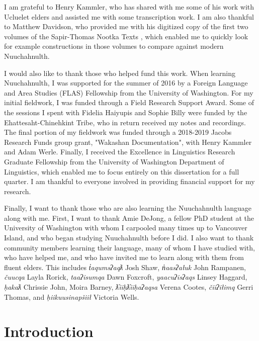 {{    I am grateful to Henry Kammler, who has shared with me some of his work with Ucluelet elders and assisted me with some transcription work. I am also thankful to Matthew Davidson, who provided me with his digitized copy of the first two volumes of the Sapir-Thomas Nootka Texts \citep{sapir1939, sapir1955}, which enabled me to quickly look for example constructions in those volumes to compare against modern Nuuchahnulth.
    
    I would also like to thank those who helped fund this work. When learning Nuuchahnulth, I was supported for the summer of 2016 by a Foreign Language and Area Studies (FLAS) Fellowship from the University of Washington. For my initial fieldwork, I was funded through a Field Research Support Award. Some of the sessions I spent with Fidelia Haiyupis and Sophie Billy were funded by the Ehattesaht-Chinehkint Tribe, who in return received my notes and recordings. The final portion of my fieldwork was funded through a 2018-2019 Jacobs Research Funds group grant, "Wakashan Documentation", with Henry Kammler and Adam Werle. Finally, I received the Excellence in Linguistics Research Graduate Fellowship from the University of Washington Department of Linguistics, which enabled me to focus entirely on this dissertation for a full quarter. I am thankful to everyone involved in providing financial support for my research.
    
    Finally, I want to thank those who are also learning the Nuuchahnulth language along with me. First, I want to thank Amie DeJong, a fellow PhD student at the University of Washington with whom I carpooled many times up to Vancouver Island, and who began studying Nuuchahnulth before I did. I also want to thank community members learning their language, many of whom I have studied with, who have helped me, and who have invited me to learn along with them from fluent elders. This includes \textit{t̓aqumsʔaqƛ} Josh Shaw, \textit{n̓aasʔałuk} John Rampanen, \textit{čuucqa} Layla Rorick, \textit{taaʔisumqa} Dawn Foxcroft, \textit{yaacuʔisʔaqs} Linsey Haggard, \textit{ḥakaƛ} Chrissie John, Moira Barney, \textit{ƛ̓iiḥƛ̓iiḥaʔaqsa} Verena Cootes, \textit{čiiʔiłimq} Gerri Thomas, and \textit{ḥiikuusinapšiił} Victoria Wells. 
   \par}
}

\chapter{Introduction} \label{ch:introduction}


